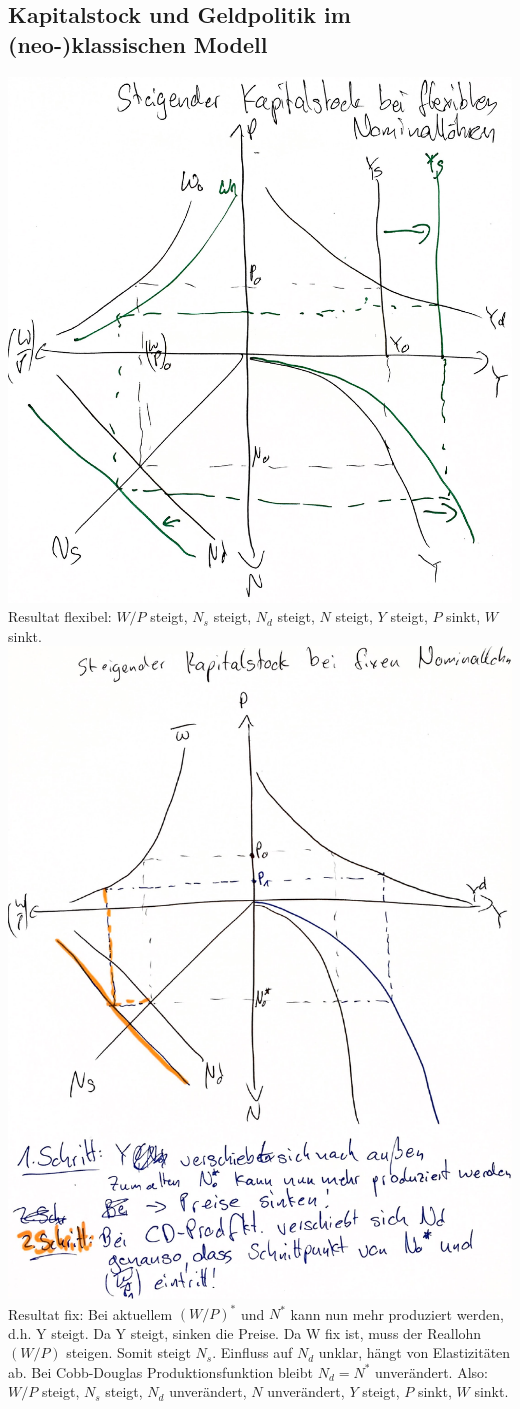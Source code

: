 \documentclass{scrartcl}
\begin{document}
\subsection{Kapitalstock und Geldpolitik im (neo-)klassischen Modell}
\includegraphics[width=.75\textwidth]{Bilder/Klassik_Kapitalstock_Flex.pdf}\\
Resultat flexibel: $W/P$ steigt, $N_s$ steigt, $N_d$ steigt, $N$ steigt, $Y$ steigt, $P$ sinkt, $W$ sinkt.\\
\includegraphics[width=.75\textwidth]{Bilder/Klassik_Kapitalstock_Fix.pdf}\\
Resultat fix: Bei aktuellem $(W/P)^*$ und $N^*$ kann nun mehr produziert werden, d.h. Y steigt. Da Y steigt, sinken die Preise. Da W fix ist, muss der Reallohn $(W/P)$ steigen. Somit steigt $N_s$. Einfluss auf $N_d$ unklar, h\"{a}ngt von Elastizit\"{a}ten ab. Bei Cobb-Douglas Produktionsfunktion bleibt $N_d=N^*$ unver\"{a}ndert.
Also: $W/P$ steigt, $N_s$ steigt, $N_d$ unver\"{a}ndert, $N$ unver\"{a}ndert, $Y$ steigt, $P$ sinkt, $W$ sinkt.
\end{document}
